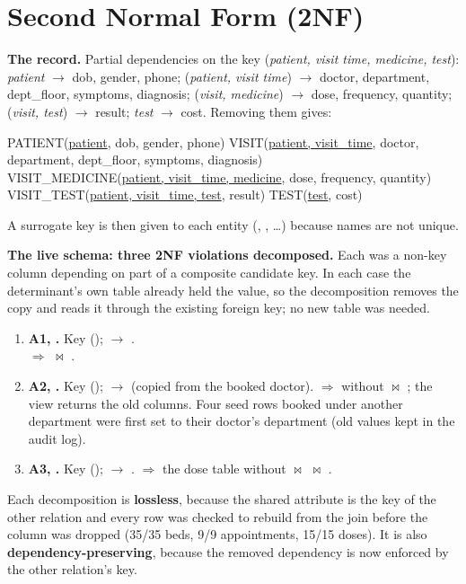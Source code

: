 \section{Second Normal Form (2NF)}
\textbf{The record.} Partial dependencies on the key (\emph{patient, visit time, medicine, test}):
\emph{patient} $\to$ dob, gender, phone; (\emph{patient, visit time}) $\to$ doctor, department, dept\_floor,
symptoms, diagnosis; (\emph{visit, medicine}) $\to$ dose, frequency, quantity; (\emph{visit, test}) $\to$ result;
\emph{test} $\to$ cost. Removing them gives:
\begin{center}\scriptsize
PATIENT(\underline{patient}, dob, gender, phone) \quad VISIT(\underline{patient, visit\_time}, doctor, department, dept\_floor, symptoms, diagnosis)\\
VISIT\_MEDICINE(\underline{patient, visit\_time, medicine}, dose, frequency, quantity) \quad VISIT\_TEST(\underline{patient, visit\_time, test}, result) \quad TEST(\underline{test}, cost)
\end{center}
A surrogate key is then given to each entity (, , \dots) because names are not unique.

\textbf{The live schema: three 2NF violations decomposed.} Each was a non-key column depending on part of a
composite candidate key. In each case the determinant's own table already held the value, so the decomposition
removes the copy and reads it through the existing foreign key; no new table was needed.
\begin{enumerate}[before=\small]
\item \textbf{A1, .} Key ();  $\to$ .
\\  $\Rightarrow$
 $\bowtie$ .
\item \textbf{A2, .} Key ();  $\to$ 
(copied from the booked doctor). $\Rightarrow$  without  $\bowtie$ ;
the view  returns the old columns. Four seed rows booked under another department were first set to their doctor's department (old values kept in the audit log).
\item \textbf{A3, .} Key ();  $\to$ .
$\Rightarrow$ the dose table without  $\bowtie$  $\bowtie$ .
\end{enumerate}
Each decomposition is \textbf{lossless}, because the shared attribute is the key of the other relation and every
row was checked to rebuild from the join before the column was dropped (35/35 beds, 9/9 appointments, 15/15 doses).
It is also \textbf{dependency-preserving}, because the removed dependency is now enforced by the other relation's key.

